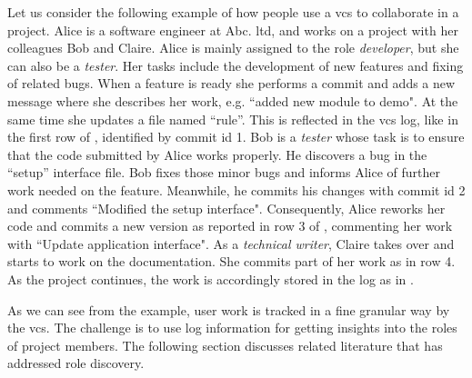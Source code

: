 Let us consider the following example of how people use a \gls*{vcs} to collaborate in a project. Alice is a software engineer at Abc. ltd, and works on a project with her colleagues Bob and Claire. Alice is mainly assigned to the role \emph{developer}, but she can also be a \emph{tester}. Her tasks include the development of new features and fixing of related bugs. When a feature is ready she performs a commit and adds a new message where she describes her work, e.g. ``added new module to demo". At the same time she updates a file named ``rule''. This is reflected in the \gls{vcs} log, like in the first row of , identified by commit id 1. Bob is a \emph{tester} whose task is to ensure that the code submitted by Alice works properly. He discovers a bug in the ``setup'' interface file. Bob fixes those minor bugs and informs Alice of further work needed on the feature. Meanwhile, he commits his changes with commit id 2 and comments ``Modified the setup interface". Consequently, Alice reworks her code and commits a new version as reported in row 3 of , commenting her work with ``Update application interface". As a \emph{technical writer}, Claire takes over and starts to work on the documentation. She commits part of her work as in row 4. As the project continues, the work is accordingly stored in the log as in .

%


As we can see from the example, user work is tracked in a fine granular way by the \gls{vcs}. The challenge is to use log information for getting insights into the roles of project members. The following section discusses related literature that has addressed role discovery.

